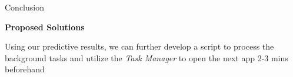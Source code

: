 \documentclass[final]{beamer}
\newlength{\sepwidth}
\newlength{\colwidth}
\newcommand{\separatorcolumn}{\begin{column}{\sepwidth}\end{column}}
\begin{document}
\begin{frame}[t]
\begin{columns}[t]
\begin{column}{\colwidth}
\begin{block} {\LARGE{Conclusion}}
\begin{itemize}
{          \item \textbf{Proposed Solutions}

                Using our predictive results, we can further develop a script to process the background tasks and utilize the \textit{Task Manager} to open the next app 2-3 mins beforehand \\
                }

        \end{itemize}
      \end{block}




    \end{column}

    \separatorcolumn
  \end{columns}
\end{frame}
\end{document}
